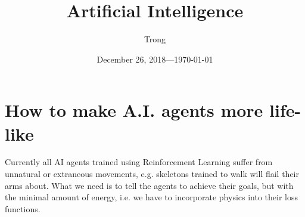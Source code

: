 \documentclass[20pt]{extarticle}
\title{Artificial Intelligence}
\author{Trong}
\date{December 26, 2018---\today}
\theoremstyle{plain}
\theoremstyle{definition}
\theoremstyle{remark}
\newcommand{\0}{\varnothing}
\newcommand{\<}{\langle}
\renewcommand{\>}{\rangle}
\begin{document}
\sloppy
\maketitle
\thispagestyle{empty}
\pagestyle{empty}

\tableofcontents
\break

\section{How to make A.I. agents more life-like}

Currently all AI agents trained using Reinforcement Learning suffer from unnatural or extraneous movements, e.g. skeletons trained to walk will flail their arms about. What we need is to tell the agents to achieve their goals, but with the minimal amount of energy, i.e. we have to incorporate physics into their loss functions.
\end{document}
